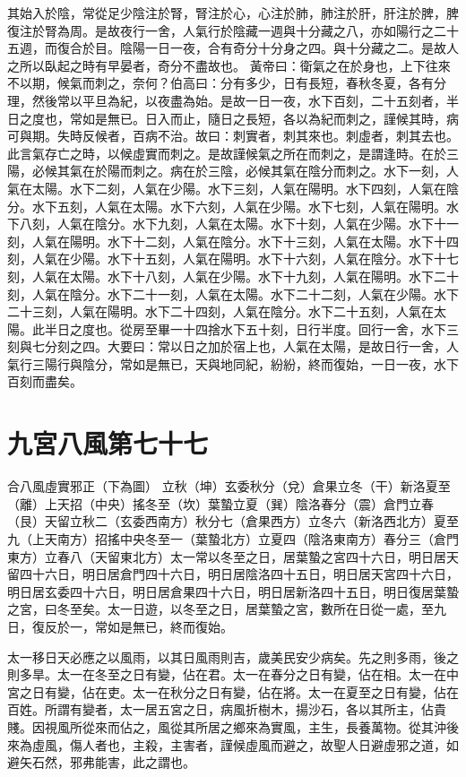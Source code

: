 其始入於陰，常從足少陰注於腎，腎注於心，心注於肺，肺注於肝，肝注於脾，脾復注於腎為周。是故夜行一舍，人氣行於陰藏一週與十分藏之八，亦如陽行之二十五週，而復合於目。陰陽一日一夜，合有奇分十分身之四。與十分藏之二。是故人之所以臥起之時有早晏者，奇分不盡故也。
黃帝曰：衛氣之在於身也，上下往來不以期，候氣而刺之，奈何？伯高曰：分有多少，日有長短，春秋冬夏，各有分理，然後常以平旦為紀，以夜盡為始。是故一日一夜，水下百刻，二十五刻者，半日之度也，常如是無已。日入而止，隨日之長短，各以為紀而刺之，謹候其時，病可與期。失時反候者，百病不治。故曰：刺實者，刺其來也。刺虛者，刺其去也。此言氣存亡之時，以候虛實而刺之。是故謹候氣之所在而刺之，是謂逢時。在於三陽，必候其氣在於陽而刺之。病在於三陰，必候其氣在陰分而刺之。水下一刻，人氣在太陽。水下二刻，人氣在少陽。水下三刻，人氣在陽明。水下四刻，人氣在陰分。水下五刻，人氣在太陽。水下六刻，人氣在少陽。水下七刻，人氣在陽明。水下八刻，人氣在陰分。水下九刻，人氣在太陽。水下十刻，人氣在少陽。水下十一刻，人氣在陽明。水下十二刻，人氣在陰分。水下十三刻，人氣在太陽。水下十四刻，人氣在少陽。水下十五刻，人氣在陽明。水下十六刻，人氣在陰分。水下十七刻，人氣在太陽。水下十八刻，人氣在少陽。水下十九刻，人氣在陽明。水下二十刻，人氣在陰分。水下二十一刻，人氣在太陽。水下二十二刻，人氣在少陽。水下二十三刻，人氣在陽明。水下二十四刻，人氣在陰分。水下二十五刻，人氣在太陽。此半日之度也。從房至畢一十四捨水下五十刻，日行半度。回行一舍，水下三刻與七分刻之四。大要曰：常以日之加於宿上也，人氣在太陽，是故日行一舍，人氣行三陽行與陰分，常如是無已，天與地同紀，紛紛，終而復始，一日一夜，水下百刻而盡矣。



\section{九宮八風第七十七}

合八風虛實邪正（下為圖）
立秋（坤）玄委秋分（兌）倉果立冬（干）新洛夏至（離）上天招（中央）搖冬至（坎）葉蟄立夏（巽）陰洛春分（震）倉門立春（艮）天留立秋二（玄委西南方）秋分七（倉果西方）立冬六（新洛西北方）夏至九（上天南方）招搖中央冬至一（葉蟄北方）立夏四（陰洛東南方）春分三（倉門東方）立春八（天留東北方）太一常以冬至之日，居葉蟄之宮四十六日，明日居天留四十六日，明日居倉門四十六日，明日居陰洛四十五日，明日居天宮四十六日，明日居玄委四十六日，明日居倉果四十六日，明日居新洛四十五日，明日復居葉蟄之宮，曰冬至矣。太一日遊，以冬至之日，居葉蟄之宮，數所在日從一處，至九日，復反於一，常如是無已，終而復始。

太一移日天必應之以風雨，以其日風雨則吉，歲美民安少病矣。先之則多雨，後之則多旱。太一在冬至之日有變，佔在君。太一在春分之日有變，佔在相。太一在中宮之日有變，佔在吏。太一在秋分之日有變，佔在將。太一在夏至之日有變，佔在百姓。所謂有變者，太一居五宮之日，病風折樹木，揚沙石，各以其所主，佔貴賤。因視風所從來而佔之，風從其所居之鄉來為實風，主生，長養萬物。從其沖後來為虛風，傷人者也，主殺，主害者，謹候虛風而避之，故聖人日避虛邪之道，如避矢石然，邪弗能害，此之謂也。

